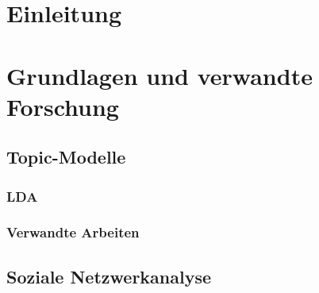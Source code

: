 \documentclass[11pt,a4paper,twoside]{article}
\begin{document}

\cleardoublepage



\pagestyle{fancy}
\setcounter{page}{1}

{
\setcounter{tocdepth}{3}
\tableofcontents
}
\cleardoublepage

\setcounter{page}{1}

\fancyhead[LE,RO]{\rightmark}
\fancyhead[LO,RE]{\leftmark}
\fancyfoot[LE,RO]{\thepage}

\cleardoublepage

\hypertarget{einleitung}{%
\section{Einleitung}\label{einleitung}}

\cleardoublepage

\hypertarget{grundlagen-und-verwandte-forschung}{%
\section{Grundlagen und verwandte
Forschung}\label{grundlagen-und-verwandte-forschung}}

\hypertarget{topic-modelle}{%
\subsection{Topic-Modelle}\label{topic-modelle}}

\hypertarget{lda}{%
\subsubsection{LDA}\label{lda}}

\hypertarget{verwandte-arbeiten}{%
\subsubsection{Verwandte Arbeiten}\label{verwandte-arbeiten}}

\hypertarget{soziale-netzwerkanalyse}{%
\subsection{Soziale Netzwerkanalyse}\label{soziale-netzwerkanalyse}}
\end{document}

